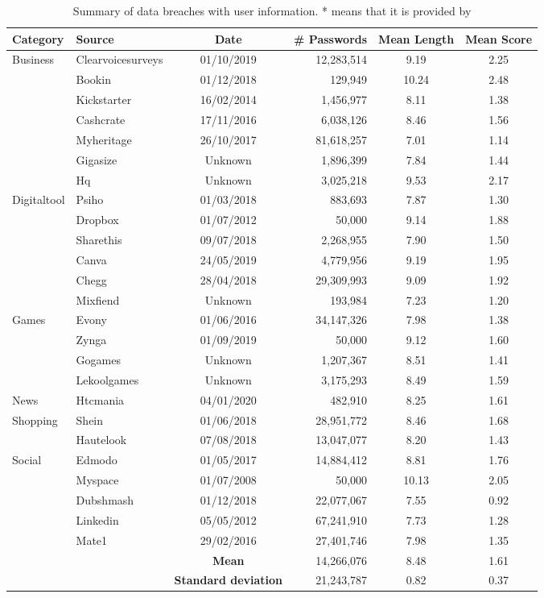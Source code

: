 \begin{table*}[h!]
\centering
\begin{tabular}{|l|l|c|r|c|c|}
\hline
\textbf{Category} & \textbf{Source} & \textbf{Date} & \textbf{\# Passwords} & \textbf{Mean Length} & \textbf{Mean Score} \\
\hline
Business&Clearvoicesurveys & 01/10/2019  & 12,283,514 & 9.19 & 2.25 \\
&Bookin & 01/12/2018  & 129,949 & 10.24 & 2.48 \\
&Kickstarter & 16/02/2014  & 1,456,977 & 8.11 & 1.38 \\
&Cashcrate & 17/11/2016  & 6,038,126 & 8.46 & 1.56 \\
&Myheritage & 26/10/2017  & 81,618,257 & 7.01 & 1.14 \\
&Gigasize & Unknown  & 1,896,399 & 7.84 & 1.44 \\
&Hq & Unknown  & 3,025,218 & 9.53 & 2.17 \\
\hline
Digitaltool&Psiho & 01/03/2018  & 883,693 & 7.87 & 1.30 \\
&Dropbox & 01/07/2012  & 50,000 & 9.14 & 1.88 \\
&Sharethis & 09/07/2018  & 2,268,955 & 7.90 & 1.50 \\
&Canva & 24/05/2019  & 4,779,956 & 9.19 & 1.95 \\
&Chegg & 28/04/2018  & 29,309,993 & 9.09 & 1.92 \\
&Mixfiend & Unknown  & 193,984 & 7.23 & 1.20 \\
\hline
Games&Evony & 01/06/2016  & 34,147,326 & 7.98 & 1.38 \\
&Zynga & 01/09/2019  & 50,000 & 9.12 & 1.60 \\
&Gogames & Unknown  & 1,207,367 & 8.51 & 1.41 \\
&Lekoolgames & Unknown  & 3,175,293 & 8.49 & 1.59 \\
\hline
News&Htcmania & 04/01/2020  & 482,910 & 8.25 & 1.61 \\
\hline
Shopping&Shein & 01/06/2018  & 28,951,772 & 8.46 & 1.68 \\
&Hautelook & 07/08/2018  & 13,047,077 & 8.20 & 1.43 \\
\hline
Social&Edmodo & 01/05/2017  & 14,884,412 & 8.81 & 1.76 \\
&Myspace & 01/07/2008  & 50,000 & 10.13 & 2.05 \\
&Dubshmash & 01/12/2018  & 22,077,067 & 7.55 & 0.92 \\
&Linkedin & 05/05/2012  & 67,241,910 & 7.73 & 1.28 \\
&Mate1 & 29/02/2016  & 27,401,746 & 7.98 & 1.35 \\
\hline
\cline{3-6}
\multicolumn{2}{l|}{\multirow{2}{*}{}}& \textbf{Mean}& 14,266,076 & 8.48 & 1.61 \\
\cline{3-6}
\multicolumn{2}{l|}{}& \textbf{Standard deviation}& 21,243,787 & 0.82 & 0.37 \\
\cline{3-6}\end{tabular}
\label{table:dataleaks}\caption{Summary of data breaches with user information. \tiny{* means that it is provided by \cite{dionysiou2021honeygen}}}
\end{table*}
